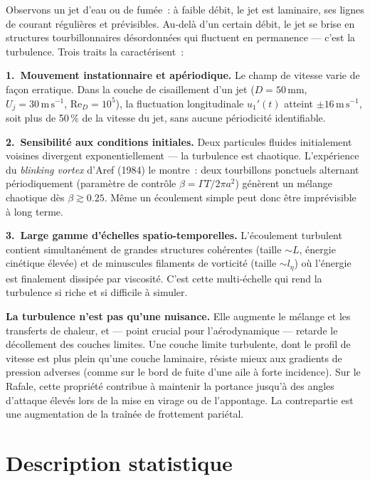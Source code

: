\documentclass[11pt,a4paper]{report}
\begin{document}
Observons un jet d'eau ou de fum\'ee~: \`a faible d\'ebit, le jet est laminaire, ses lignes de
courant r\'eguli\`eres et pr\'evisibles. Au-del\`a d'un certain d\'ebit, le jet se brise en
structures tourbillonnaires d\'esordonn\'ees qui fluctuent en permanence --- c'est la turbulence.
Trois traits la caract\'erisent~:

\medskip
\noindent\textbf{1.~Mouvement instationnaire et ap\'eriodique.}
Le champ de vitesse varie de fa\c con erratique. Dans la couche de cisaillement d'un jet
($D = 50\,\mathrm{mm}$, $U_j = 30\,\mathrm{m\,s^{-1}}$, $\mathrm{Re}_D = 10^5$), la
fluctuation longitudinale $u_1'(t)$ atteint $\pm 16\,\mathrm{m\,s^{-1}}$, soit plus de
50\,\% de la vitesse du jet, sans aucune p\'eriodicit\'e identifiable.

\medskip
\noindent\textbf{2.~Sensibilit\'e aux conditions initiales.}
Deux particules fluides initialement voisines divergent exponentiellement --- la turbulence
est chaotique. L'exp\'erience du \emph{blinking vortex} d'Aref (1984) le montre~: deux
tourbillons ponctuels alternant p\'eriodiquement (param\`etre de contr\^ole
$\beta = \Gamma T / 2\pi a^2$) g\'en\`erent un m\'elange chaotique d\`es $\beta \gtrsim 0.25$.
M\^eme un \'ecoulement simple peut donc \^etre impr\'evisible \`a long terme.

\medskip
\noindent\textbf{3.~Large gamme d'\'echelles spatio-temporelles.}
L'\'ecoulement turbulent contient simultan\'ement de grandes structures coh\'erentes (taille $\sim L$,
\'energie cin\'etique \'elev\'ee) et de minuscules filaments de vorticit\'e (taille $\sim l_\eta$)
o\`u l'\'energie est finalement dissip\'ee par viscosit\'e. C'est cette multi-\'echelle qui rend la
turbulence si riche et si difficile \`a simuler.

\medskip
\noindent\textbf{La turbulence n'est pas qu'une nuisance.}
Elle augmente le m\'elange et les transferts de chaleur, et --- point crucial pour
l'a\'erodynamique --- retarde le d\'ecollement des couches limites. Une couche limite turbulente,
dont le profil de vitesse est plus plein qu'une couche laminaire, r\'esiste mieux aux gradients
de pression adverses (comme sur le bord de fuite d'une aile \`a forte incidence). Sur le
Rafale, cette propri\'et\'e contribue \`a maintenir la portance jusqu'\`a des angles d'attaque \'elev\'es
lors de la mise en virage ou de l'appontage. La contrepartie est une augmentation de la
tra\^in\'ee de frottement pari\'etal.

\section{Description statistique}
\end{document}
